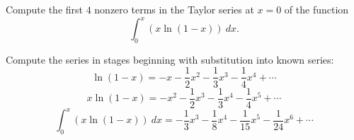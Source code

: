 \documentclass{ximera}
\begin{document}
\begin{question}%

Compute the first \(4\) nonzero terms in the Taylor series 
at \(x=0\) of the function \[\int_0^x \left( x \ln (1-x) \right) ~ dx.\]
\begin{multiplechoice}
\end{multiplechoice}
\begin{feedback}
Compute the series in stages beginning with substitution into known series:
\[\ln (1-x) =  - x - \frac{1}{2}x^{2} - \frac{1}{3}x^{3} - \frac{1}{4}x^{4} + \cdots \]
\[x \ln (1-x) =  - x^{2} - \frac{1}{2}x^{3} - \frac{1}{3}x^{4} - \frac{1}{4}x^{5} + \cdots \]
\[\int_0^x \left( x \ln (1-x) \right) ~ dx =  - \frac{1}{3}x^{3} - \frac{1}{8}x^{4} - \frac{1}{15}x^{5} - \frac{1}{24}x^{6} + \cdots \]
\end{feedback}

\end{question}
\end{document}
